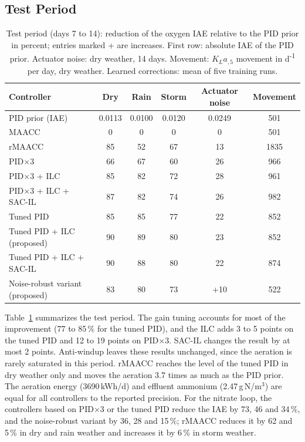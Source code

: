 \documentclass[journal]{IEEEtran}
\begin{document}
\subsection{Test Period}

\begin{table}[!t]
\centering
\caption{Test period (days 7 to 14): reduction of the oxygen IAE relative to
the PID prior in percent; entries marked + are increases. First row: absolute
IAE of the PID prior. Actuator noise: dry weather,
14 days. Movement: $K_La_{,5}$ movement in d\textsuperscript{-1} per day, dry weather.
Learned corrections: mean of five training runs.}
\label{tab:testweek}
\begin{tabular}{lccccc}
\toprule
Controller & Dry & Rain & Storm & Actuator noise & Movement\\
\midrule
PID prior \cite{wang2026maacc} (IAE) & 0.0113 & 0.0100 & 0.0120 & 0.0249 & 501\\
MAACC \cite{wang2026maacc} & 0 & 0 & 0 & 0 & 501\\
rMAACC & 85 & 52 & 67 & 13 & 1835\\
\midrule
PID$\times$3 & 66 & 67 & 60 & 26 & 966\\
PID$\times$3 + ILC & 85 & 82 & 72 & 28 & 961\\
PID$\times$3 + ILC + SAC-IL & 87 & 82 & 74 & 26 & 982\\
\midrule
Tuned PID & 85 & 85 & 77 & 22 & 852\\
Tuned PID + ILC (proposed) & 90 & 89 & 80 & 23 & 852\\
Tuned PID + ILC + SAC-IL & 90 & 88 & 80 & 22 & 874\\
Noise-robust variant (proposed) & 83 & 80 & 73 & +10 & 522\\
\bottomrule
\end{tabular}
\end{table}

Table~\ref{tab:testweek} summarizes the test period. The gain tuning
accounts for most of the improvement (77 to 85\,\% for the tuned PID), and
the ILC adds 3 to 5 points on the tuned PID and 12 to 19 points on
PID$\times$3. SAC-IL changes the result by at most 2 points. Anti-windup
leaves these results unchanged, since the aeration is rarely saturated in
this period. rMAACC reaches the level of the tuned PID in dry weather only
and moves the aeration 3.7 times as much as the PID prior. The aeration
energy (3690\,kWh/d) and effluent ammonium (2.47\,g\,N/m$^3$) are equal for
all controllers to the reported precision. For the nitrate loop, the
controllers based on PID$\times$3 or the tuned PID reduce the IAE by 73, 46
and 34\,\%, and the noise-robust variant by 36, 28 and 15\,\%; rMAACC
reduces it by 62 and 5\,\% in dry and rain weather and increases it by
6\,\% in storm weather.
\end{document}
